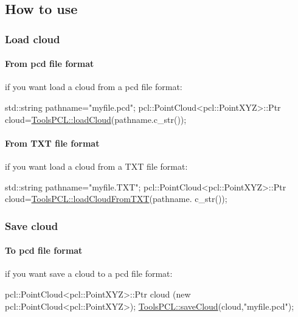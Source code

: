 \hypertarget{classToolsPCL_s1}{}\subsection{How to use}\label{classToolsPCL_s1}
\hypertarget{classToolsPCL_subs1}{}\subsubsection{Load cloud}\label{classToolsPCL_subs1}
\hypertarget{classToolsPCL_subs2}{}\paragraph{From pcd file format}\label{classToolsPCL_subs2}
if you want load a cloud from a pcd file format\-: 
\begin{DoxyCode}
std::string pathname=\textcolor{stringliteral}{"myfile.pcd"};
pcl::PointCloud<pcl::PointXYZ>::Ptr cloud=\hyperlink{classToolsPCL_a852f0884ba496b7b2a3a77aabf3923f5}{ToolsPCL::loadCloud}(pathname.c\_str());
\end{DoxyCode}
\hypertarget{classToolsPCL_subs3}{}\paragraph{From T\-X\-T file format}\label{classToolsPCL_subs3}
if you want load a cloud from a T\-X\-T file format\-: 
\begin{DoxyCode}
std::string pathname=\textcolor{stringliteral}{"myfile.TXT"};
pcl::PointCloud<pcl::PointXYZ>::Ptr cloud=\hyperlink{classToolsPCL_a99f419d563640af3422e5b964d7f9220}{ToolsPCL::loadCloudFromTXT}(pathname.
      c\_str());
\end{DoxyCode}
\hypertarget{classToolsPCL_subs4}{}\subsubsection{Save cloud}\label{classToolsPCL_subs4}
\hypertarget{classToolsPCL_subs5}{}\paragraph{To pcd file format}\label{classToolsPCL_subs5}
if you want save a cloud to a pcd file format\-: 
\begin{DoxyCode}
 pcl::PointCloud<pcl::PointXYZ>::Ptr cloud (\textcolor{keyword}{new} pcl::PointCloud<pcl::PointXYZ>);
\hyperlink{classToolsPCL_a247180362526813879137c9dda16d1dc}{ToolsPCL::saveCloud}(cloud,\textcolor{stringliteral}{"myfile.pcd"});
\end{DoxyCode}
